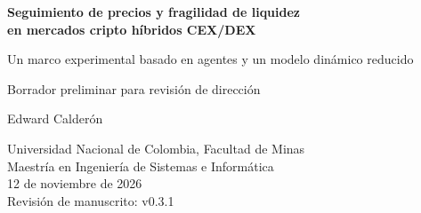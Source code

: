 \documentclass[10pt,a4paper]{article}
\newcommand{\revisionManuscrito}{v0.3.1}
\begin{document}
\begin{center}
  {\LARGE\bfseries Seguimiento de precios y fragilidad de liquidez\\
  en mercados cripto híbridos CEX/DEX\par}
  \vspace{0.35em}
  {\large Un marco experimental basado en agentes y un modelo dinámico reducido\par}
  \vspace{0.35em}
  {\normalsize Borrador preliminar para revisión de dirección\par}
  \vspace{0.8em}
  {\large Edward Calderón\par}
  Universidad Nacional de Colombia, Facultad de Minas\\
  Maestría en Ingeniería de Sistemas e Informática\\
  12 de noviembre de 2026\\
  {\small Revisión de manuscrito: \revisionManuscrito}
\end{center}







\appendix


\clearpage
\renewcommand{\refname}{Referencias}


\end{document}
